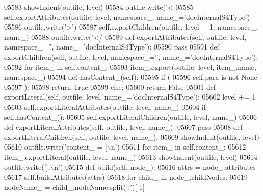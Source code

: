 \begin{DoxyCode}
{{{{{{{{{{{{{{{{{{{{{{{{{{{{{{{{{{{{{{{{{{{{{{{{{{{{{{{{{{{{{{{{{{{{{{{{{{{{{{{{{{{{{{{{{{{{{{{{{{{{{{{{{{{{{{{{{{{{{{{{{{{{{{{{{{{{{{{{{{{{{{{{{{{{{{{{{{{{{{{{{{{{{{{{{{{{{{{{{{{{{{{{{{{{{{{{{{{{{{{{{{{{{{{{{{{{{{{{{{{{{{{{{{{{{{{{{{{{{{{{{{{{{{{{{{{{{{{{{{{{{{{{{{{{{{{{{{{{{{{{{{{{{{{{{{{{{{{{{{{{{{{{{{{{{{{{{{{{{{{{{{{{{{{{{{{{{{{{{{{{{{{{05583         showIndent(outfile, level)
05584         outfile.write(\textcolor{stringliteral}{'<%
05585         self.exportAttributes(outfile, level, namespace\_, name\_=\textcolor{stringliteral}{'docInternalS4Type'})
05586         outfile.write(\textcolor{stringliteral}{'>'})
05587         self.exportChildren(outfile, level + 1, namespace\_, name\_)
05588         outfile.write(\textcolor{stringliteral}{'</%
05589     \textcolor{keyword}{def }exportAttributes(self, outfile, level, namespace\_='', name\_='docInternalS4Type'):
05590         \textcolor{keywordflow}{pass}
05591     \textcolor{keyword}{def }exportChildren(self, outfile, level, namespace\_='', name\_='docInternalS4Type'):
05592         \textcolor{keywordflow}{for} item\_ \textcolor{keywordflow}{in} self.content\_:
05593             item\_.export(outfile, level, item\_.name, namespace\_)
05594     \textcolor{keyword}{def }hasContent_(self):
05595         \textcolor{keywordflow}{if} (
05596             self.para \textcolor{keywordflow}{is} \textcolor{keywordflow}{not} \textcolor{keywordtype}{None}
05597             ):
05598             \textcolor{keywordflow}{return} \textcolor{keyword}{True}
05599         \textcolor{keywordflow}{else}:
05600             \textcolor{keywordflow}{return} \textcolor{keyword}{False}
05601     \textcolor{keyword}{def }exportLiteral(self, outfile, level, name\_='docInternalS4Type'):
05602         level += 1
05603         self.exportLiteralAttributes(outfile, level, name\_)
05604         \textcolor{keywordflow}{if} self.hasContent_():
05605             self.exportLiteralChildren(outfile, level, name\_)
05606     \textcolor{keyword}{def }exportLiteralAttributes(self, outfile, level, name\_):
05607         \textcolor{keywordflow}{pass}
05608     \textcolor{keyword}{def }exportLiteralChildren(self, outfile, level, name\_):
05609         showIndent(outfile, level)
05610         outfile.write(\textcolor{stringliteral}{'content\_ = [\(\backslash\)n'})
05611         \textcolor{keywordflow}{for} item\_ \textcolor{keywordflow}{in} self.content\_:
05612             item\_.exportLiteral(outfile, level, name\_)
05613         showIndent(outfile, level)
05614         outfile.write(\textcolor{stringliteral}{'],\(\backslash\)n'})
05615     \textcolor{keyword}{def }build(self, node\_):
05616         attrs = node\_.attributes
05617         self.buildAttributes(attrs)
05618         \textcolor{keywordflow}{for} child\_ \textcolor{keywordflow}{in} node\_.childNodes:
05619             nodeName\_ = child\_.nodeName.split(\textcolor{stringliteral}{':'})[-1]
}}}}}}}}}}}}}}}}}}}}}}}}}}}}}}}}}}}}}}}}}}}}}}}}}}}}}}}}}}}}}}}}}}}}}}}}}}}}}}}}}}}}}}}}}}}}}}}}}}}}}}}}}}}}}}}}}}}}}}}}}}}}}}}}}}}}}}}}}}}}}}}}}}}}}}}}}}}}}}}}}}}}}}}}}}}}}}}}}}}}}}}}}}}}}}}}}}}}}}}}}}}}}}}}}}}}}}}}}}}}}}}}}}}}}}}}}}}}}}}}}}}}}}}}}}}}}}}}}}}}}}}}}}}}}}}}}}}}}}}}}}}}}}}}}}}}}}}}}}}}}}}}}}}}}}}}}}}}}}}}}}}}}}}}}}}}}}}}}}}}}}}}}}
\end{DoxyCode}
